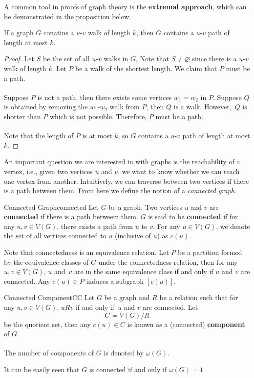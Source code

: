 \documentclass[math]{amznotes}
\theoremstyle{remark}
\begin{document}
A common tool in proofs of graph theory is the \textbf{extremal approach}, which can be demonstrated in the proposition below.
\begin{probox}{}{}
    If a graph $G$ conatins a $u$-$v$ walk of length $k$, then $G$ contains a $u$-$v$ path of length at most $k$.
    \tcblower
    \begin{proof}
        Let $S$ be the set of all $u$-$v$ walks in $G$, Note that $S \neq \varnothing$ since there is a $u$-$v$ walk of length $k$. Let $P$ be a walk of the shortest length. We claim that $P$ must be a path.
        \\\\
        Suppose $P$ is not a path, then there exists some vertices $w_1 = w_2$ in $P$. Suppose $Q$ is obtained by removing the $w_1$-$w_2$ walk from $P$, then $Q$ is a walk. However,~$Q$ is shorter than $P$ which is not possible. Therefore, $P$ must be a path.
        \\\\
        Note that the length of $P$ is at most $k$, so $G$ contains a $u$-$v$ path of length at most $k$.
    \end{proof}
\end{probox}
An important question we are interested in with graphs is the reachability of a vertex, i.e., given two vertices $u$ and $v$, we want to know whether we can reach one vertex from another. Intuitively, we can traverse between two vertices if there is a path between them. From here we define the notion of a \textit{connected graph}.
\begin{dfnbox}{Connected Graph}{connected}
    Let $G$ be a graph. Two vertices $u$ and $v$ are {\color{red} \textbf{connected}} if there is a path betweem them. $G$ is said to be {\color{red} \textbf{connected}} if for any $u, v \in V(G)$, there exists a path from $u$ to $v$. For any $u \in V(G)$, we denote the set of all vertices connected to $u$ (inclusive of $u$) as $c(u)$.
\end{dfnbox}
Note that connectedness is an equivalence relation. Let $P$ be a partition formed by the equivalence classes of $G$ under the connectedness relation, then for any $u, v \in V(G)$, $u$ and~$v$ are in the same equivalence class if and only if $u$ and $v$ are connected. Any $c(u) \in P$ induces a subgraph $[c(u)]$.
\begin{dfnbox}{Connected Component}{CC}
    Let $G$ be a graph and $R$ be a relation such that for any $u, v \in V(G)$, $uRv$ if and only if~$u$ and $v$ are connected. Let
    \begin{equation*}
        C \coloneqq V(G)/R
    \end{equation*}
    be the quotient set, then any $c(u) \in C$ is known as a (connected) {\color{red} \textbf{component}} of $G$.
    \\\\
    The number of components of $G$ is denoted by $\omega(G)$.
\end{dfnbox}
It can be easily seen that $G$ is connected if and only if $\omega(G) = 1$.
\end{document}
